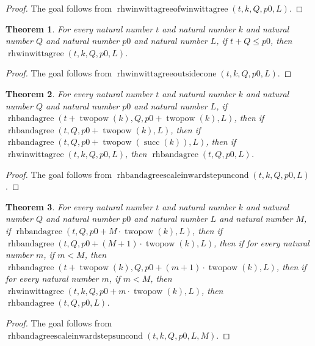 \documentclass[11pt]{article}
\newtheorem{theorem}{Theorem}[section]
\theoremstyle{definition}
\begin{document}
\begin{proof}
The goal follows from \(\operatorname{rhwinwittagreeofwinwittagree}(t, k, Q, p0, L)\).
\end{proof}
\begin{theorem}
\label{ll:paper:rhwinwittagree-outside-cone}
For every natural number \(t\) and natural number \(k\) and natural number \(Q\) and natural number \(p0\) and natural number \(L\), if \(t + Q \le p0\), then \(\operatorname{rhwinwittagree}(t, k, Q, p0, L)\).
\end{theorem}
\begin{proof}
The goal follows from \(\operatorname{rhwinwittagreeoutsidecone}(t, k, Q, p0, L)\).
\end{proof}
\begin{theorem}
\label{ll:paper:rhbandagree-scale-inward-step-uncond}
For every natural number \(t\) and natural number \(k\) and natural number \(Q\) and natural number \(p0\) and natural number \(L\), if \(\operatorname{rhbandagree}(t + \operatorname{twopow}(k), Q, p0 + \operatorname{twopow}(k), L)\), then if \(\operatorname{rhbandagree}(t, Q, p0 + \operatorname{twopow}(k), L)\), then if \(\operatorname{rhbandagree}(t, Q, p0 + \operatorname{twopow}(\operatorname{succ}(k)), L)\), then if \(\operatorname{rhwinwittagree}(t, k, Q, p0, L)\), then \(\operatorname{rhbandagree}(t, Q, p0, L)\).
\end{theorem}
\begin{proof}
The goal follows from \(\operatorname{rhbandagreescaleinwardstepuncond}(t, k, Q, p0, L)\).
\end{proof}
\begin{theorem}
\label{ll:paper:rhbandagree-scale-inward-steps-uncond}
For every natural number \(t\) and natural number \(k\) and natural number \(Q\) and natural number \(p0\) and natural number \(L\) and natural number \(M\), if \(\operatorname{rhbandagree}(t, Q, p0 + M \cdot \operatorname{twopow}(k), L)\), then if \(\operatorname{rhbandagree}(t, Q, p0 + (M + 1) \cdot \operatorname{twopow}(k), L)\), then if for every natural number \(m\), if \(m < M\), then \(\operatorname{rhbandagree}(t + \operatorname{twopow}(k), Q, p0 + (m + 1) \cdot \operatorname{twopow}(k), L)\), then if for every natural number \(m\), if \(m < M\), then \(\operatorname{rhwinwittagree}(t, k, Q, p0 + m \cdot \operatorname{twopow}(k), L)\), then \(\operatorname{rhbandagree}(t, Q, p0, L)\).
\end{theorem}
\begin{proof}
The goal follows from \(\operatorname{rhbandagreescaleinwardstepsuncond}(t, k, Q, p0, L, M)\).
\end{proof}
\end{document}

